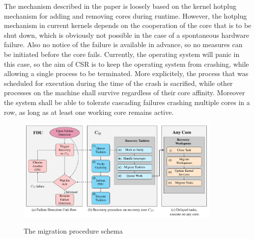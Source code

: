 \documentclass[a4paper,10pt,twoside]{article}
\begin{document}
The mechanism described in the paper is loosely based on the kernel hotplug mechanism for adding and removing cores during runtime. However, the hotplug mechanism in current kernels depends on the cooperation of the core that is to be shut down, which is obviously not possible in the case of a spontaneous hardware failure. Also no notice of the failure is available in advance, so no measures can be initiated before the core fails. Currently, the operating system will panic in this case, so the aim of CSR is to keep the operating system from crashing, while allowing a single process to be terminated. More explicitely, the process that was scheduled for execution during the time of the crash is sacrified, while other processes on the machine shall survive regardless of their core affinity. Moreover the system shall be able to tolerate cascading failures crashing multiple cores in a row, as long as at least one working core remains active.

\begin{figure}[t]
	\caption{The migration procedure schema}
	\includegraphics[width=10cm]{recovery_procedure}
	\centering
	\label{fig:migration}
\end{figure}
\end{document}
